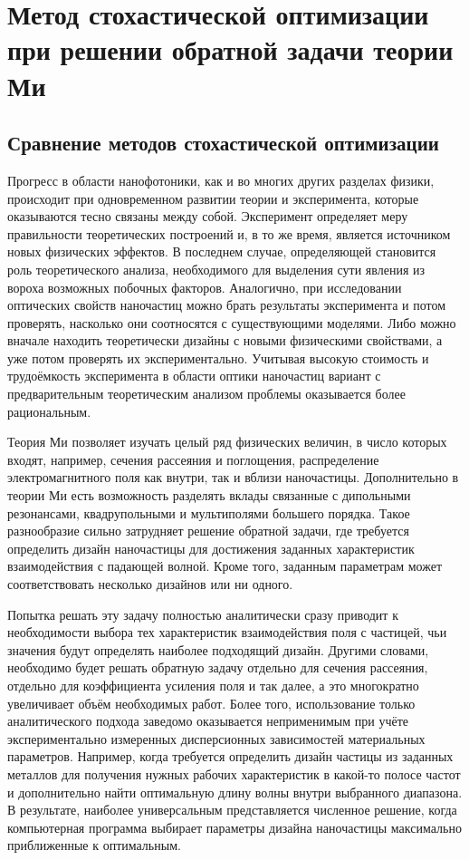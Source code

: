\chapter{Метод стохастической оптимизации при решении обратной задачи
  теории Ми} \label{chapt2}

\section{Сравнение методов стохастической оптимизации}
\label{sec:construct-review}

Прогресс в области нанофотоники, как и во многих других разделах
физики, происходит при одновременном развитии теории и эксперимента,
которые оказываются тесно связаны между собой.  Эксперимент определяет
меру правильности теоретических построений и, в то же время, является
источником новых физических эффектов. В последнем случае, определяющей
становится роль теоретического анализа, необходимого для выделения
сути явления из вороха возможных побочных факторов.  Аналогично, при
исследовании оптических свойств наночастиц можно брать результаты
эксперимента и потом проверять, насколько они соотносятся с
существующими моделями. Либо можно вначале находить теоретически
дизайны с новыми физическими свойствами, а уже потом проверять их
экспериментально.  Учитывая высокую стоимость и трудоёмкость
эксперимента в области оптики наночастиц вариант с предварительным
теоретическим анализом проблемы оказывается более рациональным.

Теория Ми позволяет изучать целый ряд физических величин, в число
которых входят, например, сечения рассеяния и поглощения,
распределение электромагнитного поля как внутри, так и вблизи
наночастицы.  Дополнительно в теории Ми есть возможность разделять
вклады связанные с дипольными резонансами, квадрупольными и
мультиполями большего порядка. Такое разнообразие сильно затрудняет
решение обратной задачи, где требуется определить дизайн наночастицы
для достижения заданных характеристик взаимодействия с падающей
волной. Кроме того, заданным параметрам может соответствовать
несколько дизайнов или ни одного.

Попытка решать эту задачу полностью аналитически сразу приводит к
необходимости выбора тех характеристик взаимодействия поля с частицей,
чьи значения будут определять наиболее подходящий дизайн. Другими
словами, необходимо будет решать обратную задачу отдельно для сечения
рассеяния, отдельно для коэффициента усиления поля и так далее, а это
многократно увеличивает объём необходимых работ. Более того,
использование только аналитического подхода заведомо оказывается
неприменимым при учёте экспериментально измеренных дисперсионных
зависимостей материальных параметров. Например, когда требуется
определить дизайн частицы из заданных металлов для получения нужных
рабочих характеристик в какой-то полосе частот и дополнительно
найти оптимальную длину волны внутри выбранного диапазона.  В
результате, наиболее универсальным представляется численное решение,
когда компьютерная программа выбирает параметры дизайна наночастицы
максимально приближенные к оптимальным.

